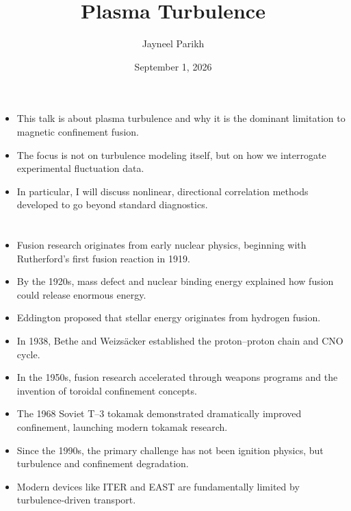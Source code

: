 \documentclass{article}
\title{Plasma Turbulence}
\author{Jayneel Parikh}
\date{September 1, 2026}
\begin{document}
\section{}
\begin{itemize}
\item This talk is about plasma turbulence and why it is the dominant limitation to magnetic confinement fusion.
\item The focus is not on turbulence modeling itself, but on how we interrogate experimental fluctuation data.
\item In particular, I will discuss nonlinear, directional correlation methods developed to go beyond standard diagnostics.
\end{itemize}

\section{}
\begin{itemize}
\item Fusion research originates from early nuclear physics, beginning with Rutherford’s first fusion reaction in 1919.
\item By the 1920s, mass defect and nuclear binding energy explained how fusion could release enormous energy.
\item Eddington proposed that stellar energy originates from hydrogen fusion.
\item In 1938, Bethe and Weizsäcker established the proton--proton chain and CNO cycle.
\item In the 1950s, fusion research accelerated through weapons programs and the invention of toroidal confinement concepts.
\item The 1968 Soviet T--3 tokamak demonstrated dramatically improved confinement, launching modern tokamak research.
\item Since the 1990s, the primary challenge has not been ignition physics, but turbulence and confinement degradation.
\item Modern devices like ITER and EAST are fundamentally limited by turbulence-driven transport.
\end{itemize}
\end{document}
